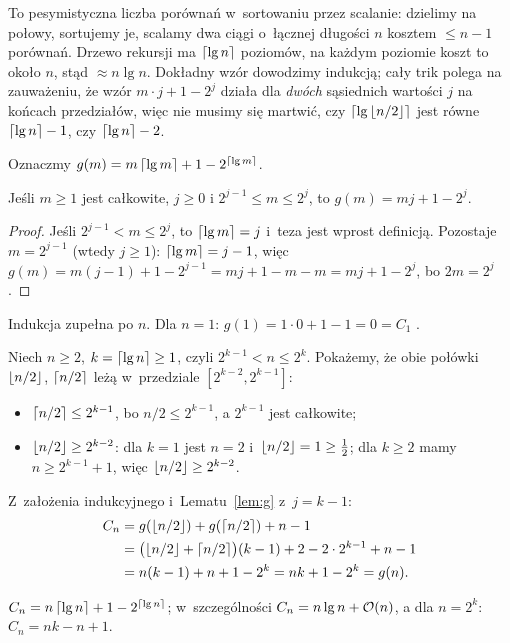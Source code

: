 \documentclass[11pt]{article}
\begin{document}
\begin{intuicja}
To pesymistyczna liczba porównań w~sortowaniu przez scalanie: dzielimy na
połowy, sortujemy je, scalamy dwa ciągi o~łącznej długości $n$ kosztem
$\le n-1$ porównań. Drzewo rekursji ma $\left\lceil \operatorname{lg} n \right\rceil$ poziomów, na każdym
poziomie koszt to około $n$, stąd $\approx n\lg n$. Dokładny wzór
dowodzimy indukcją; cały trik polega na zauważeniu, że wzór
$m\cdot j+1-2^j$ działa dla \emph{dwóch} sąsiednich wartości $j$ na końcach
przedziałów, więc nie musimy się martwić, czy $\left\lceil \operatorname{lg}\left\lfloor n/2 \right\rfloor \right\rceil$ jest
równe $\left\lceil \operatorname{lg} n \right\rceil-1$, czy $\left\lceil \operatorname{lg} n \right\rceil-2$.
\end{intuicja}

Oznaczmy $g(m)=m\left\lceil \operatorname{lg} m \right\rceil+1-2^{\left\lceil \operatorname{lg} m \right\rceil}$.

\begin{lemat}\label{lem:g}
Jeśli $m\ge1$ jest całkowite, $j\ge0$ i $2^{j-1}\le m\le 2^j$, to $g(m)=mj+1-2^j$.
\end{lemat}
\begin{proof}
Jeśli $2^{j-1}<m\le2^j$, to $\left\lceil \operatorname{lg} m \right\rceil=j$ i~teza jest wprost definicją.
Pozostaje $m=2^{j-1}$ (wtedy $j\ge1$): $\left\lceil \operatorname{lg} m \right\rceil=j-1$, więc
$g(m)=m(j-1)+1-2^{j-1} = mj+1-m-m = mj+1-2^j$, bo $2m=2^j$.
\end{proof}

\formalnie
Indukcja zupełna po $n$. Dla $n=1$: $g(1)=1\cdot0+1-1=0=C_1$ \checkmark.

Niech $n\ge2$, $k=\left\lceil \operatorname{lg} n \right\rceil\ge1$, czyli $2^{k-1}<n\le2^k$. Pokażemy, że
obie połówki $\left\lfloor n/2 \right\rfloor$, $\left\lceil n/2 \right\rceil$ leżą w~przedziale $[2^{k-2},2^{k-1}]$:
\begin{itemize}
\item $\left\lceil n/2 \right\rceil\le 2^{k-1}$, bo $n/2\le2^{k-1}$, a $2^{k-1}$ jest całkowite;
\item $\left\lfloor n/2 \right\rfloor\ge 2^{k-2}$: dla $k=1$ jest $n=2$ i~$\left\lfloor n/2 \right\rfloor=1\ge\frac12$; dla
$k\ge2$ mamy $n\ge2^{k-1}+1$, więc $\left\lfloor n/2 \right\rfloor\ge 2^{k-2}$.
\end{itemize}
Z~założenia indukcyjnego i~Lematu~\ref{lem:g} z~$j=k-1$:
\begin{align*}
C_n &= g(\left\lfloor n/2 \right\rfloor) + g(\left\lceil n/2 \right\rceil) + n-1\\
&= \bigl(\left\lfloor n/2 \right\rfloor+\left\lceil n/2 \right\rceil\bigr)(k-1) + 2 - 2\cdot2^{k-1} + n - 1\\
&= n(k-1)+n+1-2^k = nk+1-2^k = g(n).\qedhere
\end{align*}
\begin{odpowiedz}
$C_n=n\left\lceil \operatorname{lg} n \right\rceil+1-2^{\left\lceil \operatorname{lg} n \right\rceil}$; w~szczególności $C_n = n\operatorname{lg} n+\mathcal{O}(n)$, a dla $n=2^k$: $C_n=nk-n+1$.
\end{odpowiedz}
\end{document}
